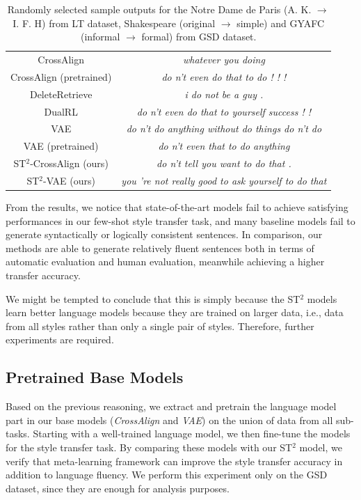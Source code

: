 \begin{table}[th]
\begin{tabular}{c|c}
		CrossAlign & \emph{whatever you doing} \\
		CrossAlign (pretrained) & \emph{do n't even do that to do ! ! !} \\
		DeleteRetrieve & \emph{i do not be a guy .} \\
		DualRL & \emph{do n't even do that to yourself success ! !} \\
		VAE & \emph{do n't do anything without do things do n't do} \\
		VAE (pretrained) & \emph{do n't even that to do anything} \\
		\hline
		ST$^2$-CrossAlign (ours) & \emph{do n't tell you want to do that .} \\
		ST$^2$-VAE (ours) & \emph{you 're not really good to ask yourself to do that} \\
		\hline
	\end{tabular}
	\caption{Randomly selected sample outputs for the Notre Dame de Paris (A. K. $\rightarrow$ I. F. H) from LT dataset, Shakespeare (original $\rightarrow$ simple) and GYAFC (informal $\rightarrow$ formal) from GSD dataset.}\label{tb:qual}
\end{table}

From the results, we notice that state-of-the-art models fail to achieve satisfying performances in our few-shot style transfer task, and many baseline models fail to generate syntactically or logically consistent sentences. In comparison, our methods are able to generate relatively fluent sentences both in terms of automatic evaluation and human evaluation, meanwhile achieving a higher transfer accuracy.

We might be tempted to conclude that this is simply because the 
ST$^2$ models learn better language models because they are trained on larger data, 
i.e., data from all styles rather than only a single pair of styles. 
Therefore, further experiments are required.

\subsection{Pretrained Base Models}
\label{sec:pretrain}

Based on the previous reasoning, we extract and pretrain the language model part in our base models (\emph{CrossAlign} and \emph{VAE}) on the union of data from all sub-tasks. Starting with a well-trained language model, we then fine-tune the models for the style transfer task. By comparing these models with our ST$^2$ model, we verify that meta-learning framework can improve the style transfer accuracy in addition to language fluency. We perform this experiment only on the GSD dataset, since they are enough for analysis purposes. 

